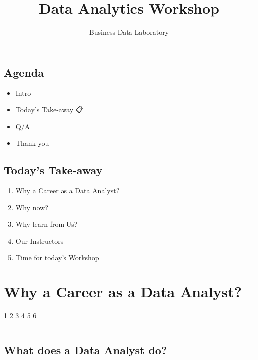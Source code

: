 \documentclass[
  letterpaper,
  DIV=11,
  numbers=noendperiod]{scrartcl}
\title{Data Analytics Workshop}
\author{Business Data Laboratory}
\date{}
\providecommand{\tightlist}{%
  \setlength{\itemsep}{0pt}\setlength{\parskip}{0pt}}\usepackage{longtable,booktabs,array}
\begin{document}
\maketitle
\ifdefined\Shaded\renewenvironment{Shaded}{\begin{tcolorbox}[borderline west={3pt}{0pt}{shadecolor}, boxrule=0pt, enhanced, interior hidden, sharp corners, breakable, frame hidden]}{\end{tcolorbox}}\fi

\hypertarget{agenda}{%
\subsection{Agenda}\label{agenda}}

\begin{itemize}
\item
  Intro {👋}
\item
  Today's Take-away {📋}
\item
  Q/A
\item
  Thank you
\end{itemize}

\hypertarget{todays-take-away}{%
\subsection{Today's Take-away}\label{todays-take-away}}

\begin{enumerate}
\def\labelenumi{\arabic{enumi}.}
\tightlist
\item
  Why a Career as a Data Analyst?
\item
  Why now?
\item
  Why learn from Us?
\item
  Our Instructors
\item
  Time for today's Workshop
\end{enumerate}

\hypertarget{why-a-career-as-a-data-analyst}{%
\section{Why a Career as a Data
Analyst?}\label{why-a-career-as-a-data-analyst}}

1 {2 3 4 5 6}

\begin{center}\rule{0.5\linewidth}{0.5pt}\end{center}

\hypertarget{what-does-a-data-analyst-do}{%
\subsection{What does a Data Analyst
do?}\label{what-does-a-data-analyst-do}}
\end{document}
